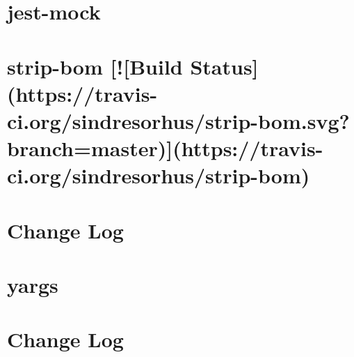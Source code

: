 \documentclass[twoside]{book}
\newcommand{\+}{\discretionary{\mbox{\scriptsize$\hookleftarrow$}}{}{}}
\begin{document}
\chapter{jest-\/mock}
\label{md__c_1_workspace_demo_src_main_script_node_modules_jest-mock__r_e_a_d_m_e}

\chapter{strip-\/bom \mbox{[}!\mbox{[}Build Status\mbox{]}(https\+://travis-\/ci.org/sindresorhus/strip-\/bom.svg?branch=master)\mbox{]}(https\+://travis-\/ci.org/sindresorhus/strip-\/bom)}
\label{md__c_1_workspace_demo_src_main_script_node_modules_jest-runtime_node_modules_strip-bom_readme}

\chapter{Change Log}
\label{md__c_1_workspace_demo_src_main_script_node_modules_jest-runtime_node_modules_yargs__c_h_a_n_g_e_l_o_g}

\chapter{yargs}
\label{md__c_1_workspace_demo_src_main_script_node_modules_jest-runtime_node_modules_yargs__r_e_a_d_m_e}

\chapter{Change Log}
\label{md__c_1_workspace_demo_src_main_script_node_modules_jest-runtime_node_modules_yargs-parser__c_h_a_n_g_e_l_o_g}

\end{document}
